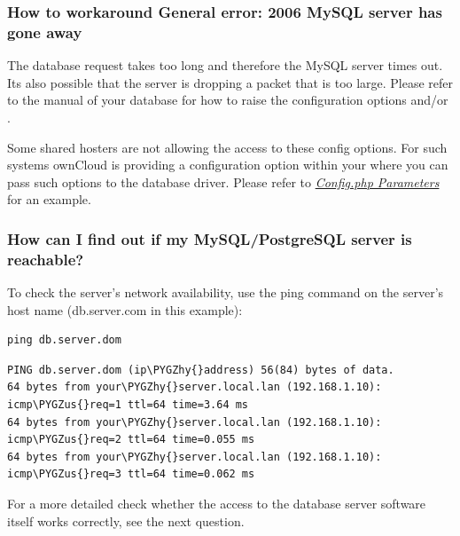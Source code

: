 \documentclass[letterpaper,10pt,english]{sphinxmanual}
\def\PYGZus{\char`\_}
\def\PYGZhy{\char`\-}
\begin{document}
\subsubsection{How to workaround General error: 2006 MySQL server has gone away}
\label{configuration_database/linux_database_configuration:how-to-workaround-general-error-2006-mysql-server-has-gone-away}
The database request takes too long and therefore the MySQL server times out. Its
also possible that the server is dropping a packet that is too large. Please
refer to the manual of your database for how to raise the configuration options
 and/or .

Some shared hosters are not allowing the access to these config options. For such
systems ownCloud is providing a  configuration option within your
 where you can pass such options to the database driver.
Please refer to {\hyperref[configuration_server/config_sample_php_parameters::doc]{\emph{Config.php Parameters}}} for an example.


\subsubsection{How can I find out if my MySQL/PostgreSQL server is reachable?}
\label{configuration_database/linux_database_configuration:how-can-i-find-out-if-my-mysql-postgresql-server-is-reachable}
To check the server's network availability, use the ping command on
the server's host name (db.server.com in this example):

\begin{Verbatim}[commandchars=\\\{\}]
ping db.server.dom
\end{Verbatim}

\begin{Verbatim}[commandchars=\\\{\}]
PING db.server.dom (ip\PYGZhy{}address) 56(84) bytes of data.
64 bytes from your\PYGZhy{}server.local.lan (192.168.1.10): icmp\PYGZus{}req=1 ttl=64 time=3.64 ms
64 bytes from your\PYGZhy{}server.local.lan (192.168.1.10): icmp\PYGZus{}req=2 ttl=64 time=0.055 ms
64 bytes from your\PYGZhy{}server.local.lan (192.168.1.10): icmp\PYGZus{}req=3 ttl=64 time=0.062 ms
\end{Verbatim}

For a more detailed check whether the access to the database server software
itself works correctly, see the next question.
\end{document}
